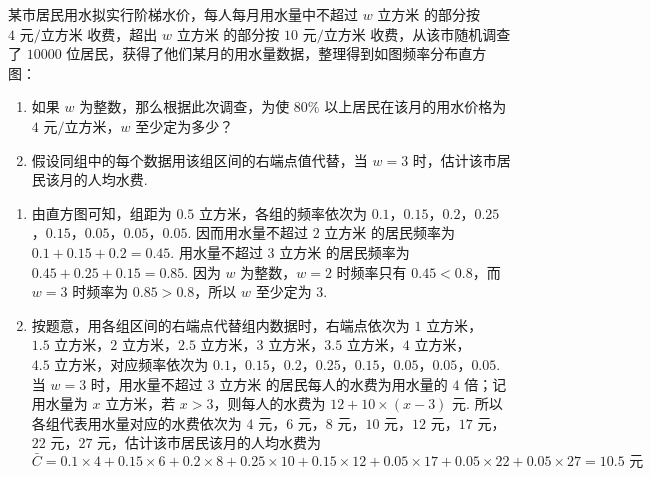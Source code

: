 \begin{problem}
某市居民用水拟实行阶梯水价，每人每月用水量中不超过 \(w\text{ 立方米}\) 的部分按 \(4\text{ 元/立方米}\) 收费，超出 \(w\text{ 立方米}\) 的部分按 \(10\text{ 元/立方米}\) 收费，从该市随机调查了 \(10000\) 位居民，获得了他们某月的用水量数据，整理得到如图频率分布直方图：

\begin{enumerate}
\item 如果 \(w\) 为整数，那么根据此次调查，为使 \(80\%\) 以上居民在该月的用水价格为 \(4\text{ 元/立方米}\)，\(w\) 至少定为多少？
\item 假设同组中的每个数据用该组区间的右端点值代替，当 \(w=3\) 时，估计该市居民该月的人均水费.
\end{enumerate}

\end{problem}

\begin{solution}
\begin{enumerate}
\item 由直方图可知，组距为 \(0.5\text{ 立方米}\)，各组的频率依次为 \(0.1\)，\(0.15\)，\(0.2\)，\(0.25\)，\(0.15\)，\(0.05\)，\(0.05\)，\(0.05\). 因而用水量不超过 \(2\text{ 立方米}\) 的居民频率为
\(0.1+0.15+0.2=0.45\).
用水量不超过 \(3\text{ 立方米}\) 的居民频率为
\(0.45+0.25+0.15=0.85\).
因为 \(w\) 为整数，\(w=2\) 时频率只有 \(0.45<0.8\)，而 \(w=3\) 时频率为 \(0.85>0.8\)，所以 \(w\) 至少定为 \(3\).

\item 按题意，用各组区间的右端点代替组内数据时，右端点依次为 \(1\text{ 立方米}\)，\(1.5\text{ 立方米}\)，\(2\text{ 立方米}\)，\(2.5\text{ 立方米}\)，\(3\text{ 立方米}\)，\(3.5\text{ 立方米}\)，\(4\text{ 立方米}\)，\(4.5\text{ 立方米}\)，对应频率依次为 \(0.1\)，\(0.15\)，\(0.2\)，\(0.25\)，\(0.15\)，\(0.05\)，\(0.05\)，\(0.05\). 当 \(w=3\) 时，用水量不超过 \(3\text{ 立方米}\) 的居民每人的水费为用水量的 \(4\) 倍；记用水量为 \(x\text{ 立方米}\)，若 \(x>3\)，则每人的水费为 \(12+10\times\left(x-3\right)\) 元. 所以各组代表用水量对应的水费依次为 \(4\text{ 元}\)，\(6\text{ 元}\)，\(8\text{ 元}\)，\(10\text{ 元}\)，\(12\text{ 元}\)，\(17\text{ 元}\)，\(22\text{ 元}\)，\(27\text{ 元}\)，估计该市居民该月的人均水费为
\[
\bar C=0.1\times4+0.15\times6+0.2\times8+0.25\times10+0.15\times12+0.05\times17+0.05\times22+0.05\times27=10.5\text{ 元}
\]
\end{enumerate}
\end{solution}

